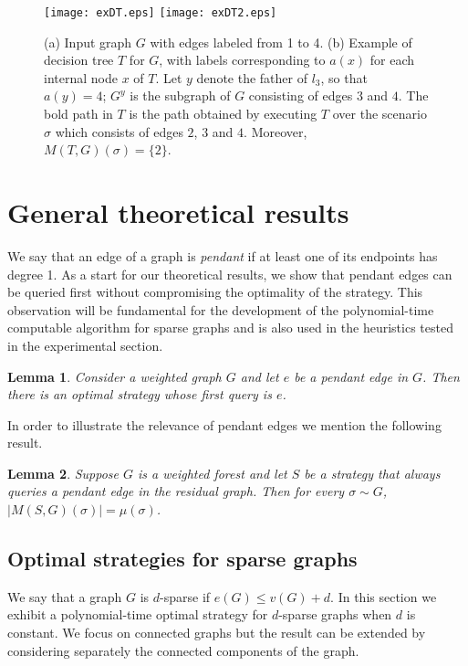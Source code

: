 \documentclass[12pt]{article}
\newtheorem{lemma}{Lemma}
\newcommand{\Mf}[2]{M(#1,#2)}
\begin{document}
\begin{figure}
	\centering
		\texttt{[image: exDT.eps]} \hspace{90pt}
		\texttt{[image: exDT2.eps]}
	\caption{(a) Input graph $G$ with edges labeled from 1 to 4. (b) Example of decision tree $T$ for $G$, with labels corresponding to $a(x)$ for each internal node $x$ of $T$. Let $y$ denote the father of $l_3$, so that $a(y) = 4$; $G^y$ is the subgraph of $G$ consisting of edges $3$ and $4$. The bold path in $T$ is the path obtained by executing $T$ over the scenario $\sigma$ which consists of edges $2$, $3$ and $4$. Moreover, $\Mf{T}{G}(\sigma) = \{2\}$.}
	\label{fig:exDT}
\end{figure}



	\section{General theoretical results} \label{theoretical}
	
	We say that an edge of a graph is \emph{pendant} if at least one of its endpoints has degree 1. As a start for our theoretical results, we show that pendant edges can be queried first without compromising the optimality of the strategy. This observation will be fundamental for the development of the polynomial-time computable algorithm for sparse graphs and is also used in the heuristics tested in the experimental section. 
		
	\begin{lemma} \label{pendantFirst}
		Consider a weighted graph $G$ and let $e$ be a pendant edge in $G$. Then there is an optimal strategy whose first query is $e$. 
	\end{lemma}
		

	In order to illustrate the relevance of pendant edges we mention the following result.
	
	\begin{lemma}
		Suppose $G$ is a weighted forest and let $S$ be a strategy that always queries a pendant edge in the residual graph. Then for every $\sigma \sim G$, $|\Mf{S}{G}(\sigma)| = \mu(\sigma)$.
	\end{lemma}


	\subsection{Optimal strategies for sparse graphs} \label{optSparse}
	
	We say that a graph $G$ is $d$-sparse if $e(G) \le v(G) + d$. In this section we exhibit a polynomial-time optimal strategy for $d$-sparse graphs when $d$ is constant. We focus on connected graphs but the result can be extended by considering separately the connected components of the graph. 
	
\end{document}
